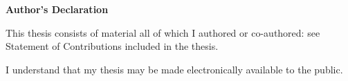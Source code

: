 \begin{center}\textbf{Author's Declaration}\end{center}

\noindent
This thesis consists of material all of which I authored or co-authored: see Statement of Contributions included in the thesis. 

\bigskip

\noindent
I understand that my thesis may be made electronically available to the public.

\clearpage